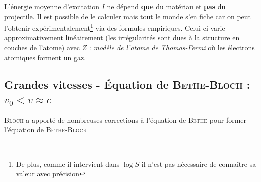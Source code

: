 L'énergie moyenne d'excitation $I$ ne dépend \textbf{que} du matériau et \textbf{pas} du 
projectile. Il est possible de le calculer mais tout le monde s'en fiche car on peut l'obtenir
expérimentalement\footnote{De plus, comme il intervient dans $\log S$ il n'est pas nécessaire
de connaître sa valeur avec précision} via des formules empiriques. Celui-ci varie approximativement
linéairement (les irrégularités sont dues à la structure en couches de l'atome) avec $Z$ :
\textit{modèle de l'atome de Thomas-Fermi} où les électrons atomiques forment un gaz.

\newpage
\subsection{Grandes vitesses - Équation de \textsc{Bethe-Bloch} : $v_0<v\approx c$}
\textsc{Bloch} a apporté de nombreuses corrections à l'équation de \textsc{Bethe} pour 
former l'équation de \textsc{Bethe-Block}\\

\ \\

